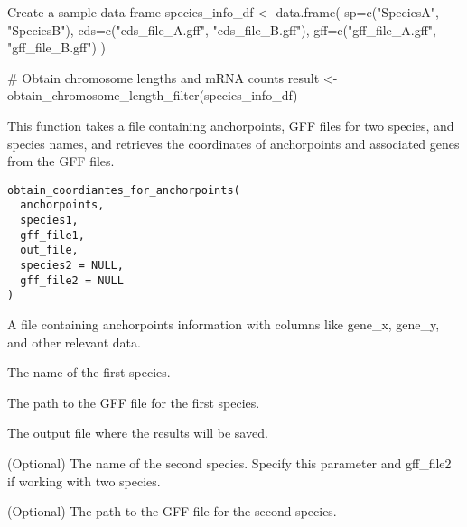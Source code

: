 \documentclass[a4paper]{book}
\begin{document}
%
\begin{Examples}
\begin{ExampleCode}
Create a sample data frame
species_info_df <- data.frame(
  sp=c("SpeciesA", "SpeciesB"),
  cds=c("cds_file_A.gff", "cds_file_B.gff"),
  gff=c("gff_file_A.gff", "gff_file_B.gff")
)

# Obtain chromosome lengths and mRNA counts
result <- obtain_chromosome_length_filter(species_info_df)
\end{ExampleCode}
\end{Examples}
%
\begin{Description}\relax
This function takes a file containing anchorpoints, GFF files for two species, and species names,
and retrieves the coordinates of anchorpoints and associated genes from the GFF files.
\end{Description}
%
\begin{Usage}
\begin{verbatim}
obtain_coordiantes_for_anchorpoints(
  anchorpoints,
  species1,
  gff_file1,
  out_file,
  species2 = NULL,
  gff_file2 = NULL
)
\end{verbatim}
\end{Usage}
%
\begin{Arguments}
\begin{ldescription}
\item[\code{anchorpoints}] A file containing anchorpoints information with columns like gene\_x, gene\_y, and other relevant data.

\item[\code{species1}] The name of the first species.

\item[\code{gff\_file1}] The path to the GFF file for the first species.

\item[\code{out\_file}] The output file where the results will be saved.

\item[\code{species2}] (Optional) The name of the second species. Specify this parameter and gff\_file2 if working with two species.

\item[\code{gff\_file2}] (Optional) The path to the GFF file for the second species.
\end{ldescription}
\end{Arguments}
\end{document}
